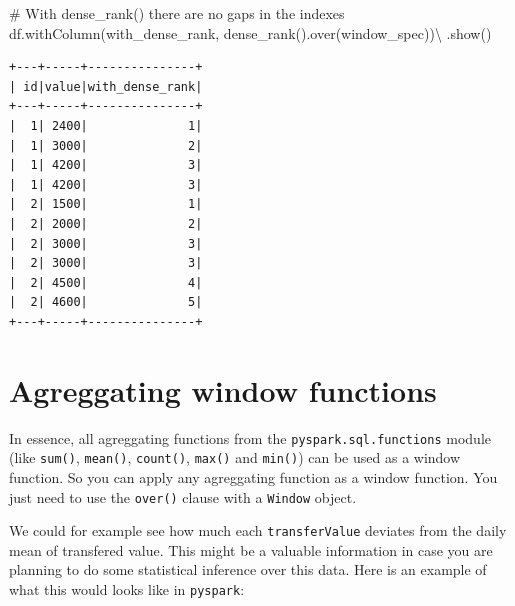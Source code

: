 \documentclass[
  11pt,
  letterpaper,
  DIV=11,
  numbers=noendperiod]{scrreprt}
\newenvironment{Shaded}{\begin{snugshade}}{\end{snugshade}}
\newcommand{\CommentTok}[1]{\textcolor[rgb]{0.37,0.37,0.37}{#1}}
\newcommand{\NormalTok}[1]{\textcolor[rgb]{0.00,0.23,0.31}{#1}}
\newcommand{\OperatorTok}[1]{\textcolor[rgb]{0.37,0.37,0.37}{#1}}
\newcommand{\StringTok}[1]{\textcolor[rgb]{0.13,0.47,0.30}{#1}}
\begin{document}
\begin{Shaded}
\begin{Highlighting}[]
\CommentTok{\# With dense\_rank() there are no gaps in the indexes}
\NormalTok{df.withColumn(}\StringTok{\textquotesingle{}with\_dense\_rank\textquotesingle{}}\NormalTok{, dense\_rank().over(window\_spec))}\OperatorTok{\textbackslash{}}
\NormalTok{    .show()}
\end{Highlighting}
\end{Shaded}

\begin{verbatim}
+---+-----+---------------+
| id|value|with_dense_rank|
+---+-----+---------------+
|  1| 2400|              1|
|  1| 3000|              2|
|  1| 4200|              3|
|  1| 4200|              3|
|  2| 1500|              1|
|  2| 2000|              2|
|  2| 3000|              3|
|  2| 3000|              3|
|  2| 4500|              4|
|  2| 4600|              5|
+---+-----+---------------+
\end{verbatim}

\hypertarget{agreggating-window-functions}{%
\section{Agreggating window
functions}\label{agreggating-window-functions}}

In essence, all agreggating functions from the
\texttt{pyspark.sql.functions} module (like \texttt{sum()},
\texttt{mean()}, \texttt{count()}, \texttt{max()} and \texttt{min()})
can be used as a window function. So you can apply any agreggating
function as a window function. You just need to use the \texttt{over()}
clause with a \texttt{Window} object.

We could for example see how much each \texttt{transferValue} deviates
from the daily mean of transfered value. This might be a valuable
information in case you are planning to do some statistical inference
over this data. Here is an example of what this would looks like in
\texttt{pyspark}:
\end{document}
